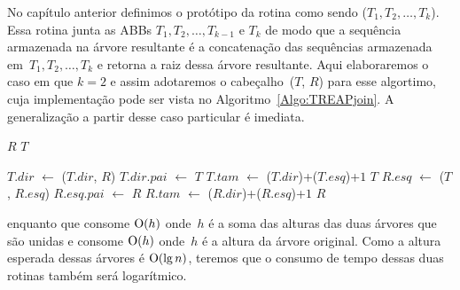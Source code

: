 No capítulo anterior definimos o protótipo da rotina \treapJoin{} como sendo \treapJoin($T_1, T_2, \ldots, T_k$).
Essa rotina junta as ABBs $T_1, T_2, \ldots, T_{k-1}$ e $T_k$ de modo que a sequência armazenada na árvore resultante é a concatenação das sequências armazenada em~$T_1, T_2, \ldots, T_k$ e retorna a raiz dessa árvore resultante.
Aqui elaboraremos o caso em que $k=2$ e assim adotaremos o cabeçalho~\treapJoin($T$, $R$) para esse algortimo, cuja implementação pode ser vista no Algoritmo~\ref{Algo:TREAPjoin}.
A generalização a partir desse caso particular é imediata.

\begin{algorithm}
\caption{\treapJoin($T$, $R$)}
\label{Algo:TREAPjoin}
\begin{algorithmic}[1]
 \Return $R$
\EndIf
{} \Return $T$
\EndIf

  \State $T$.$dir$ $\gets$ \treapJoin($T$.$dir$, $R$)
  \State $T$.$dir$.$pai$ $\gets$ $T$
  \State $T$.$tam$ $\gets$ \treapGetSize($T$.$dir$)+\treapGetSize($T$.$esq$)+$1$
  \State \Return $T$
\Else 
  \State $R$.$esq$ $\gets$ \treapJoin($T$, $R$.$esq$)
  \State $R$.$esq$.$pai$ $\gets$ $R$
  \State $R$.$tam$ $\gets$ \treapGetSize($R$.$dir$)+\treapGetSize($R$.$esq$)+$1$
  \State \Return $R$
\EndIf
\end{algorithmic}
\end{algorithm}





enquanto que \treapJoin{} consome $\mathrm{O}(h)$ onde~$h$ é a soma das alturas das duas árvores que são unidas e \treapSplit{} consome $\mathrm{O}(h)$ onde~$h$ é a altura da árvore original. Como a altura esperada dessas árvores é  $\mathrm{O}(\lg n)$, teremos que o consumo de tempo dessas duas rotinas também será logarítmico.



